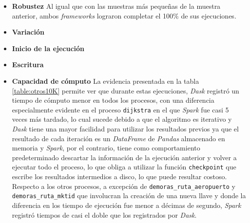 \begin{itemize}
	
	\item \textbf{Robustez} Al igual que con las muestras más pequeñas de la muestra anterior, ambos \textit{frameworks} lograron completar el 100\% de sus ejecuciones.
	
	\item \textbf{Variación} 
	
	\item \textbf{Inicio de la ejecución} 
	
	\item \textbf{Escritura} 
	
	\item \textbf{Capacidad de cómputo} La evidencia presentada en la tabla \ref{table:otros10K} permite ver que durante estas ejecuciones, \textit{Dask} registró un tiempo de  cómputo menor en todos los procesos, con una diferencia especialmente evidente en el proceso \texttt{dijkstra} en el que \textit{Spark} fue casi 5 veces más tardado, lo cual sucede debido a que el algoritmo es iterativo y \textit{Dask} tiene una mayor facilidad para utilizar los resultados previos ya que el resultado de cada iteración es un \textit{DataFrame} de \textit{Pandas} almacenado en memoria y \textit{Spark}, por el contrario, tiene como comportamiento predeterminado descartar la información de la ejecución anterior y volver a ejecutar todo el proceso, lo que obliga a utilizar la función \texttt{checkpoint} que escribe los resultados intermedios a disco, lo que puede resultar costoso. Respecto a los otros procesos, a excepción de \texttt{demoras\_ruta\_aeropuerto} y \texttt{demoras\_ruta\_mktid} que involucran la creación de una nueva llave y donde la diferencia en los tiempo de ejecución fue menor a décimas de segundo, \textit{Spark} registró tiempos de casi el doble que los registrados por \textit{Dask}.
	

\end{itemize}

